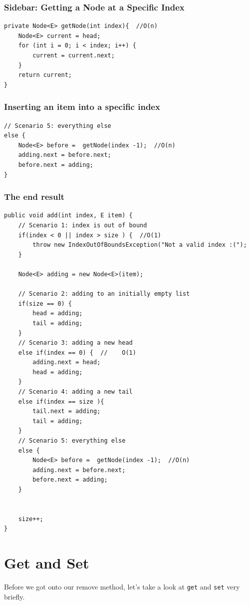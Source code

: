 \documentclass[10pt,a4paper]{book}
\begin{document}
\subsubsection{Sidebar: Getting a Node at a Specific Index}
\begin{verbatim}
private Node<E> getNode(int index){  //O(n)
	Node<E> current = head;
	for (int i = 0; i < index; i++) {
		current = current.next;
	}
	return current;
}	
\end{verbatim}



\subsubsection{Inserting an item into a specific index}

\begin{verbatim}
// Scenario 5: everything else
else {
	Node<E> before =  getNode(index -1);  //O(n)
	adding.next = before.next;
	before.next = adding;
}	
\end{verbatim}

\subsubsection{The end result}
\begin{verbatim}
public void add(int index, E item) {
	// Scenario 1: index is out of bound
	if(index < 0 || index > size ) {  //O(1)
		throw new IndexOutOfBoundsException("Not a valid index :(");
	}
	
	Node<E> adding = new Node<E>(item);
	
	// Scenario 2: adding to an initially empty list
	if(size == 0) {
		head = adding;
		tail = adding;
	}
	// Scenario 3: adding a new head
	else if(index == 0) {  //    O(1)
		adding.next = head;
		head = adding;
	}
	// Scenario 4: adding a new tail
	else if(index == size ){
		tail.next = adding;
		tail = adding;
	}
	// Scenario 5: everything else
	else {
		Node<E> before =  getNode(index -1);  //O(n)
		adding.next = before.next;
		before.next = adding;
	}
	
	
	size++;
}
\end{verbatim}



\section{Get and Set}
Before we got onto our remove method, let's take a look at \texttt{get} and \texttt{set} very briefly.
\end{document}
